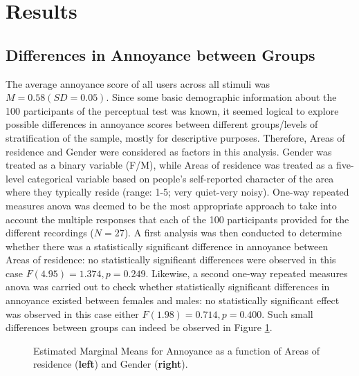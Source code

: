 
\section{Results}

\subsection{Differences in Annoyance between Groups}

The average annoyance score of all users across all stimuli was $M=0.58 (SD=0.05)$. Since some basic demographic information about the 100 participants of the perceptual test was known, it seemed logical to explore possible differences in annoyance scores between different groups/levels of stratification of the sample, mostly for descriptive purposes. Therefore, Areas of residence and Gender were considered as factors in this analysis. Gender was treated as a binary variable (F/M), while Areas of residence was treated as a five-level categorical variable based on people's self-reported character of the area where they typically reside (range: 1-5; very quiet-very noisy). One-way repeated measures \gls{anova} was deemed to be the most appropriate approach to take into account the multiple responses that each of the 100 participants provided for the different recordings ($N=27$). A first analysis was then conducted to determine whether there was a statistically significant difference in annoyance between Areas of residence: no statistically significant differences were observed in this case $F(4.95)=1.374, p=0.249$. Likewise, a second one-way repeated measures \gls{anova} was carried out to check whether statistically significant differences in annoyance existed between females and males: no statistically significant effect was observed in this case either $F(1.98)=0.714, p=0.400$. Such small differences between groups can indeed be observed in Figure \ref{fig:anova}.

\begin{figure}
  \label{fig:anova}
  \centering
  \caption{Estimated Marginal Means for Annoyance as a function of Areas of residence (\textbf{left}) and Gender (\textbf{right}).}
\end{figure}

